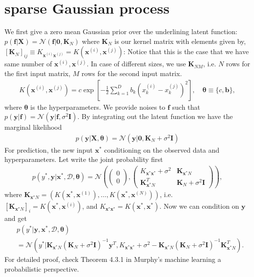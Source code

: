 \documentclass[10pt,a4paper]{article}
\begin{document}
\section{sparse Gaussian process}
We first give a zero mean Gaussian prior over the underlining latent function: $p(\pmb{f}|\pmb{X})=\mathcal{N}(\pmb{f}|\pmb{0},\pmb{K}_N)$ where $\pmb{K}_N$ is our kernel matrix with elements given by, $[\pmb{K}_N]_{ij}\equiv K_{\pmb{x}^{(i)}\pmb{x}^{(j)}}=K(\pmb{x}^{(i)},\pmb{x}^{(j)})$: Notice that this is the case that we have same number of $\pmb{x}^{(i)},\pmb{x}^{(j)}$. In case of different sizes, we use $\pmb{K}_{NM}$, i.e. $N$ rows for the first input matrix, $M$ rows for the second input matrix.
\begin{align}
K(\pmb{x}^{(i)},\pmb{x}^{(j)})=c\exp [-\frac{1}{2}\sum_{k=1}^{D}b_k(x^{(i)}_k-x^{(j)}_k)^2], \quad\pmb{\theta}\equiv \lbrace c,\pmb{b}\rbrace,
\end{align}
where $\pmb{\theta}$ is the hyperparameters.
We provide noises to $\pmb{f}$ such that $p(\pmb{y}|\pmb{f})=\mathcal{N}(\pmb{y}|\pmb{f},\sigma^2\pmb{I})$. By integrating out the latent function we have the marginal likelihood
\begin{align}
p(\pmb{y}|\pmb{X},\pmb{\theta})=\mathcal{N}(\pmb{y}|\pmb{0},\pmb{K}_N+\sigma^2\pmb{I})
\end{align}
For prediction, the new input $\pmb{x}^*$ conditioning on the observed data and hyperparameters. Let write the joint probability first
\begin{align}
p(y^*,\pmb{y}|\pmb{x}^*,\mathcal{D},\pmb{\theta})=\mathcal{N}\left(\begin{pmatrix}
0\\0
\end{pmatrix},\begin{pmatrix}
K_{\pmb{x}^*\pmb{x}^*}+\sigma^2 & \pmb{K}_{\pmb{x}^*N}\\
\pmb{K}_{\pmb{x}^*N}^T & \pmb{K}_N+\sigma^2\pmb{I} 
\end{pmatrix}\right),
\label{cgjoint}
\end{align}
where $\pmb{K}_{\pmb{x}^*N}=(K(\pmb{x}^*,\pmb{x}^{(1)}),\dots,K(\pmb{x}^*,\pmb{x}^{(N)}))$, i.e. $[\pmb{K}_{\pmb{x}^*N}]_{i}=K(\pmb{x}^*,\pmb{x}^{(i)})$, and $K_{\pmb{x}^*\pmb{x}^*}=K(\pmb{x}^*,\pmb{x}^*)$. 
Now we can condition on $\pmb{y}$ and get
\begin{align}
&p(y^*|\pmb{y},\pmb{x}^*,\mathcal{D},\pmb{\theta})\nonumber\\
&=\mathcal{N}(y^*|\pmb{K}_{\pmb{x}^*N}(\pmb{K}_N+\sigma^2\pmb{I})^{-1}\pmb{y}^T,K_{\pmb{x}^*\pmb{x}^*}+\sigma^2-\pmb{K}_{\pmb{x}^*N}(\pmb{K}_N+\sigma^2\pmb{I})^{-1}\pmb{K}_{\pmb{x}^*N}^T).
\label{cgcondition}
\end{align}
For detailed proof, check Theorem 4.3.1 in Murphy's machine learning a probabilistic perspective.
\end{document}

